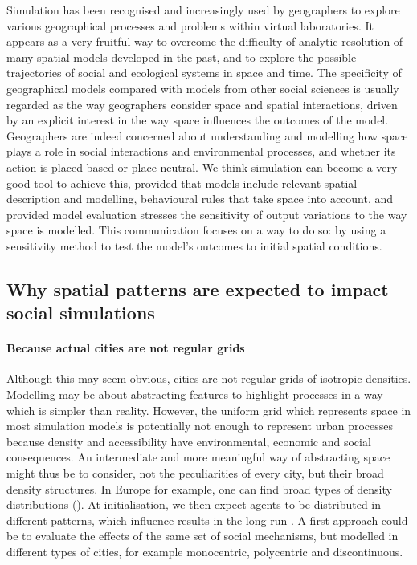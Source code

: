 \documentclass[11pt]{article}
\begin{document}
Simulation has been recognised and increasingly used by geographers to explore various geographical processes and problems within virtual laboratories. It appears as a very fruitful way to overcome the difficulty of analytic resolution of many spatial models developed in the past, and to explore the possible trajectories of social and ecological systems in space and time. The specificity of geographical models compared with models from other social sciences is usually regarded as the way geographers consider space and spatial interactions, driven by an explicit interest in the way space influences the outcomes of the model. Geographers are indeed concerned about understanding and modelling how space plays a role in social interactions and environmental processes, and whether its action is placed-based or place-neutral. We think simulation can become a very good tool to achieve this, provided that models include relevant spatial description and modelling, behavioural rules that take space into account, and provided model evaluation  stresses the sensitivity of output variations to the way space is modelled. This communication focuses on a way to do  so: by using a sensitivity method to test the model's outcomes to initial spatial conditions.

\subsection{Why spatial patterns are expected to impact social simulations}

\paragraph{Because actual cities are not regular grids}
Although this may seem obvious, cities are not regular grids of isotropic densities. Modelling may be about abstracting features to highlight processes in a way which is simpler than reality. However, the uniform grid which represents space in most simulation models is potentially not enough to represent urban processes because density and accessibility have environmental, economic and social consequences. An intermediate and more meaningful way of abstracting space might thus be to consider, not the peculiarities of every city, but their broad density structures. In Europe for example, one can find broad types of density distributions (\cite{LeNechet2015}). At initialisation, we then expect agents to be distributed in different patterns, which influence results in the long run \cite{Castellanoetal2009}. A first approach could be to evaluate the effects of the same set of social mechanisms, but modelled in different types of cities, for example monocentric, polycentric and discontinuous.
\end{document}
